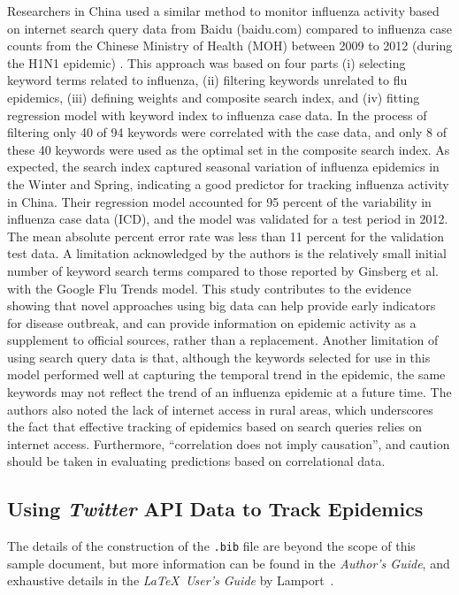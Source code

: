 \documentclass[sigconf]{acmart}
\begin{document}
Researchers in China used a similar method to monitor influenza activity based 
on internet search query data from Baidu (baidu.com) compared to influenza case 
counts from the Chinese Ministry of Health (MOH) between 2009 to 2012 (during the 
H1N1 epidemic) \cite{yuan13}. This approach was based on four parts (i) selecting 
keyword terms related to influenza, (ii) filtering keywords unrelated to flu 
epidemics, (iii) defining weights and composite search index, and (iv) fitting 
regression model with keyword index to influenza case data. In the process of 
filtering only 40 of 94 keywords were correlated with the case data, and only 8 
of these 40 keywords were used as the optimal set in the composite search index. 
As expected, the search index captured seasonal variation of influenza epidemics 
in the Winter and Spring, indicating a good predictor for tracking influenza activity
in China.  Their regression model accounted for 95 percent of the variability in 
influenza case data (ICD), and the model was validated for a test period in 2012. 
The mean absolute percent error rate was less than 11 percent for the validation 
test data. A limitation acknowledged by the authors is the relatively small initial 
number of keyword search terms compared to those reported by Ginsberg et al. with the
Google Flu Trends model. This study contributes to the evidence showing that novel
approaches using big data can help provide early indicators for disease outbreak, 
and can provide information on epidemic activity as a supplement to official sources,
rather than a replacement. Another limitation of using search query data is that, 
although the keywords selected for use in this model performed well at capturing 
the temporal trend in the epidemic, the same keywords may not reflect the trend of 
an influenza epidemic at a future time. The authors also noted the lack of internet 
access in rural areas, which underscores the fact that effective tracking of 
epidemics based on search queries relies on internet access. Furthermore, 
“correlation does not imply causation”, and caution should be taken in evaluating 
predictions based on correlational data.    


\subsection{Using {\itshape Twitter} API Data to Track Epidemics}

The details of the construction of the \texttt{.bib} file are beyond
the scope of this sample document, but more information can be found
in the \textit{Author's Guide}, and exhaustive details in the \textit{\LaTeX\ 
User's Guide} by Lamport~.
\end{document}
